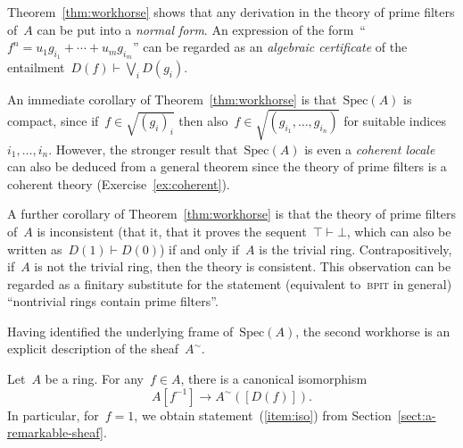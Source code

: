 \documentclass{ws-rv9x6}
\newcommand{\Spec}{\mathrm{Spec}}
\renewcommand{\_}{\mathpunct{.}}
\newcommand{\?}{\,{:}\,}
\newcommand{\BPIT}{\textsc{bpit}\xspace}
\begin{document}
Theorem~\ref{thm:workhorse} shows that any derivation in the theory of prime
filters of~$A$ can be put into a \emph{normal form}. An expression of the
form~``$f^n = u_1 g_{i_1} + \cdots + u_m g_{i_m}$'' can be regarded as an
\emph{algebraic certificate} of the entailment~$D(f) \vdash \bigvee_i D(g_i)$.

\begin{remark}An immediate corollary of Theorem~\ref{thm:workhorse} is
that~$\Spec(A)$ is compact, since if~$f \in \sqrt{(g_i)_i}$ then also~$f \in
\sqrt{(g_{i_1},\ldots,g_{i_n})}$ for suitable indices~$i_1,\ldots,i_n$.
However, the stronger result that~$\Spec(A)$ is
even a \emph{coherent locale} can also be deduced from a general theorem
since the theory of prime filters is a coherent theory
(Exercise~\ref{ex:coherent}).\end{remark}

\begin{remark}\label{rem:consistency}
A further corollary of Theorem~\ref{thm:workhorse} is that the theory of prime
filters of~$A$ is inconsistent (that it, that it proves the sequent~$\top
\vdash \bot$, which can also be written as~$D(1) \vdash D(0)$) if and only
if~$A$ is the trivial ring. Contrapositively, if~$A$ is not the trivial ring,
then the theory is consistent. This observation can be regarded as a finitary
substitute for the statement (equivalent to~\BPIT in general) ``nontrivial rings contain prime filters''.
\end{remark}

Having identified the underlying frame of~$\Spec(A)$, the second workhorse is
an explicit description of the sheaf~$A^\sim$.

\begin{proposition}\label{prop:identification}
Let~$A$ be a ring. For any~$f \in A$, there is a canonical isomorphism
\[ A[f^{-1}] \longrightarrow A^\sim([D(f)]). \]
In particular, for~$f = 1$, we obtain statement~(\ref{item:iso}) from
Section~\ref{sect:a-remarkable-sheaf}.
\end{proposition}
\end{document}
